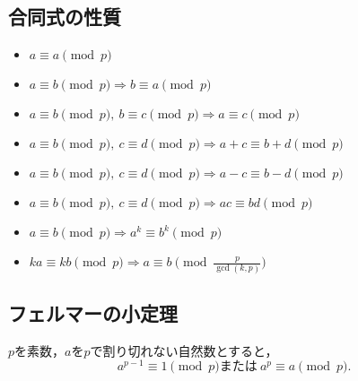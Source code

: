 \subsection{合同式の性質}
\begin{itemize}
	\item $a \equiv a \pmod{p}$
	\item $a \equiv b \pmod{p} \Rightarrow b \equiv a \pmod{p}$
	\item $a \equiv b \pmod{p},~ b \equiv c \pmod{p} \Rightarrow a \equiv c \pmod{p}$
	\item $a \equiv b \pmod{p},~ c \equiv d \pmod{p} \Rightarrow a+c \equiv b+d \pmod{p}$
	\item $a \equiv b \pmod{p},~ c \equiv d \pmod{p} \Rightarrow a-c \equiv b-d \pmod{p}$
	\item $a \equiv b \pmod{p},~ c \equiv d \pmod{p} \Rightarrow ac \equiv bd \pmod{p}$
	\item $a \equiv b \pmod{p} \Rightarrow a^k \equiv b^k \pmod{p}$
	\item $ka \equiv kb \pmod{p} \Rightarrow a \equiv b \pmod{\frac{p}{\gcd(k,p)}}$
\end{itemize}

\subsection{フェルマーの小定理}
$p$を素数，$a$を$p$で割り切れない自然数とすると，
\[
	a^{p-1} \equiv 1 \pmod{p} \mbox{または}~ a^{p} \equiv a \pmod{p}.
\]
